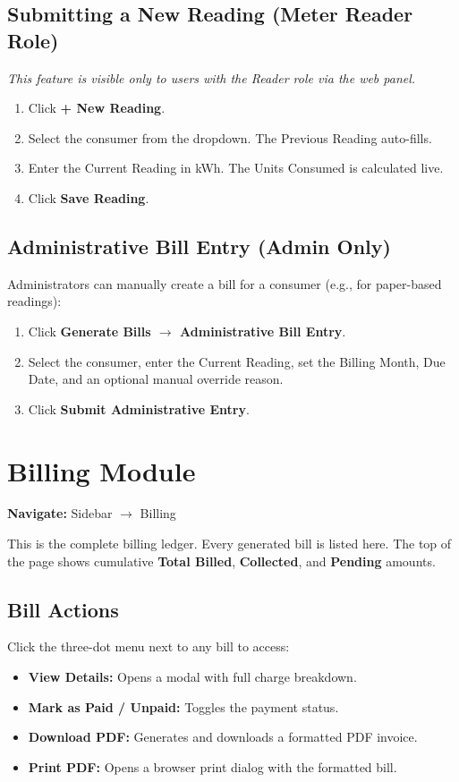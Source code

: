 \documentclass[12pt, a4paper]{report}
\begin{document}
\subsection{Submitting a New Reading (Meter Reader Role)}
\textit{This feature is visible only to users with the Reader role via the web panel.}
\begin{enumerate}
    \item Click \textbf{+ New Reading}.
    \item Select the consumer from the dropdown. The Previous Reading auto-fills.
    \item Enter the Current Reading in kWh. The Units Consumed is calculated live.
    \item Click \textbf{Save Reading}.
\end{enumerate}

\subsection{Administrative Bill Entry (Admin Only)}
Administrators can manually create a bill for a consumer (e.g., for paper-based readings):
\begin{enumerate}
    \item Click \textbf{Generate Bills $\rightarrow$ Administrative Bill Entry}.
    \item Select the consumer, enter the Current Reading, set the Billing Month, Due Date, and an optional manual override reason.
    \item Click \textbf{Submit Administrative Entry}.
\end{enumerate}

\section{Billing Module}

\textbf{Navigate:} Sidebar $\rightarrow$ Billing

This is the complete billing ledger. Every generated bill is listed here. The top of the page shows cumulative \textbf{Total Billed}, \textbf{Collected}, and \textbf{Pending} amounts.

\subsection{Bill Actions}
Click the three-dot menu next to any bill to access:
\begin{itemize}
    \item \textbf{View Details:} Opens a modal with full charge breakdown.
    \item \textbf{Mark as Paid / Unpaid:} Toggles the payment status.
    \item \textbf{Download PDF:} Generates and downloads a formatted PDF invoice.
    \item \textbf{Print PDF:} Opens a browser print dialog with the formatted bill.
\end{itemize}
\end{document}
